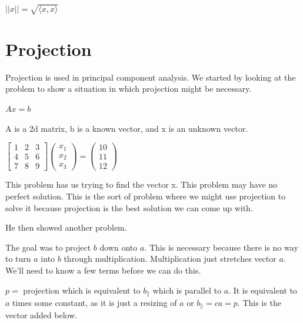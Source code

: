 \vspace{0.8em} 

$||x|| = \sqrt{\langle x,x \rangle}$


\section{Projection}

Projection is used in principal component analysis. We started by looking at the problem to show a situation in which projection might be necessary.

$Ax=b$

A is a 2d matrix, b is a known vector, and x is an unknown vector.

$\begin{bmatrix}
1 & 2 & 3\\
4 & 5 & 6\\
7 & 8 & 9
\end{bmatrix}
\begin{pmatrix}
x_1\\
x_2\\
x_3
\end{pmatrix}
=
\begin{pmatrix}
10\\
11\\
12
\end{pmatrix}$

This problem has us trying to find the vector x. 
This problem may have no perfect solution. 
This is the sort of problem where we might use projection to solve it because projection is the best solution we can come up with.

He then showed another problem.


The goal was to project $b$ down onto $a$. This is necessary because there is no way to turn $a$ into $b$ through multiplication. 
Multiplication just stretches vector $a$. We'll need to know a few terms before we can do this.

$p =$ projection which is equivalent to $b_\|$ which is parallel to $a$. It is equivalent to $a$ times some constant, as it is just a resizing of $a$ or $b_\| = ca = p$. 
This is the vector added below.

